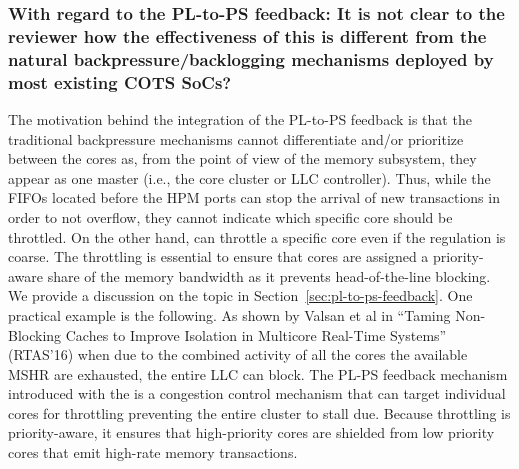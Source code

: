
        \subsubsection{With regard to the PL-to-PS feedback: It is not
        clear to the reviewer how the effectiveness of this is
        different from the natural backpressure/backlogging mechanisms
        deployed by most existing COTS SoCs?}

        The motivation behind the integration of the PL-to-PS feedback
        is that the traditional backpressure mechanisms cannot
        differentiate and/or prioritize between the cores as, from the
        point of view of the memory subsystem, they appear as one
        master (i.e., the core cluster or LLC controller).  Thus,
        while the FIFOs located before the HPM ports can stop the
        arrival of new transactions in order to not overflow, they
        cannot indicate which specific core should be throttled. On
        the other hand, \schim can throttle a specific core even if
        the regulation is coarse.  The throttling is essential to
        ensure that cores are assigned a priority-aware share of the
        memory bandwidth as it prevents head-of-the-line blocking. We
        provide a discussion on the topic in
        Section~\ref{sec:pl-to-ps-feedback}. One practical example is
        the following. As shown by Valsan et al in ``Taming
        Non-Blocking Caches to Improve Isolation in Multicore
        Real-Time Systems'' (RTAS'16) when due to the combined
        activity of all the cores the available MSHR are exhausted,
        the entire LLC can block. The PL-PS feedback mechanism
        introduced with the \schim is a congestion control mechanism
        that can target individual cores for throttling preventing the
        entire cluster to stall due. Because throttling is
        priority-aware, it ensures that high-priority cores are
        shielded from low priority cores that emit high-rate memory
        transactions.

